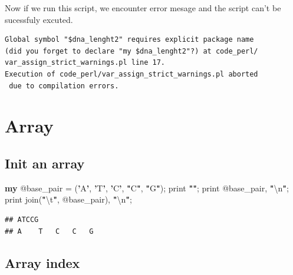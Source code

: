 \documentclass[]{book}
\makeatletter
\newenvironment{Shaded}{\begin{snugshade}}{\end{snugshade}}
\newcommand{\CharTok}[1]{\textcolor[rgb]{0.31,0.60,0.02}{#1}}
\newcommand{\DataTypeTok}[1]{\textcolor[rgb]{0.13,0.29,0.53}{#1}}
\newcommand{\FunctionTok}[1]{\textcolor[rgb]{0.00,0.00,0.00}{#1}}
\newcommand{\KeywordTok}[1]{\textcolor[rgb]{0.13,0.29,0.53}{\textbf{#1}}}
\newcommand{\NormalTok}[1]{#1}
\newcommand{\StringTok}[1]{\textcolor[rgb]{0.31,0.60,0.02}{#1}}
\newenvironment{kframe}{%
\medskip{}
\setlength{\fboxsep}{.8em}
 \def\at@end@of@kframe{}%
 \ifinner\ifhmode%
  \def\at@end@of@kframe{\end{minipage}}%
  \begin{minipage}{\columnwidth}%
 \fi\fi%
 \def\FrameCommand##1{\hskip\@totalleftmargin \hskip-\fboxsep
 \colorbox{shadecolor}{##1}\hskip-\fboxsep
     \hskip-\linewidth \hskip-\@totalleftmargin \hskip\columnwidth}%
 \MakeFramed {\advance\hsize-\width
   \@totalleftmargin\z@ \linewidth\hsize
   \@setminipage}}%
 {\par\unskip\endMakeFramed%
 \at@end@of@kframe}
\renewenvironment{Shaded}{\begin{kframe}}{\end{kframe}}
\makeatother
\begin{document}
Now if we run this script, we encounter error mesage and the script can't be sucessfuly excuted.

\begin{verbatim}
Global symbol "$dna_lenght2" requires explicit package name 
(did you forget to declare "my $dna_lenght2"?) at code_perl/
var_assign_strict_warnings.pl line 17.
Execution of code_perl/var_assign_strict_warnings.pl aborted
 due to compilation errors.
\end{verbatim}

\hypertarget{array}{%
\section{Array}\label{array}}

\hypertarget{init-an-array}{%
\subsection{Init an array}\label{init-an-array}}

\begin{Shaded}
\begin{Highlighting}[]
\KeywordTok{my} \DataTypeTok{@base_pair}\NormalTok{ = (}\KeywordTok{'}\StringTok{A}\KeywordTok{'}\NormalTok{, }\KeywordTok{'}\StringTok{T}\KeywordTok{'}\NormalTok{, }\KeywordTok{'}\StringTok{C}\KeywordTok{'}\NormalTok{, }\KeywordTok{"}\StringTok{C}\KeywordTok{"}\NormalTok{, }\KeywordTok{"}\StringTok{G}\KeywordTok{"}\NormalTok{);}
\FunctionTok{print} \KeywordTok{""}\NormalTok{;}
\FunctionTok{print} \DataTypeTok{@base_pair}\NormalTok{, }\KeywordTok{"}\CharTok{\textbackslash{}n}\KeywordTok{"}\NormalTok{;}
\FunctionTok{print} \FunctionTok{join}\NormalTok{(}\KeywordTok{"}\CharTok{\textbackslash{}t}\KeywordTok{"}\NormalTok{, }\DataTypeTok{@base_pair}\NormalTok{), }\KeywordTok{"}\CharTok{\textbackslash{}n}\KeywordTok{"}\NormalTok{;}
\end{Highlighting}
\end{Shaded}

\begin{verbatim}
## ATCCG
## A    T   C   C   G
\end{verbatim}

\hypertarget{array-index}{%
\subsection{Array index}\label{array-index}}
\end{document}
